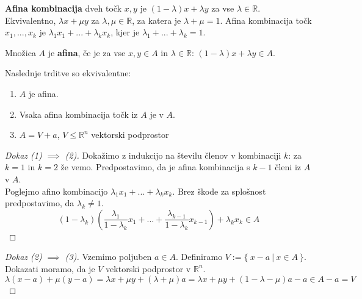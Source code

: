 \documentclass[11pt, a4paper]{article}
\begin{document}
    \begin{definition}
        \textbf{Afina kombinacija} dveh točk \(x,y\) je \((1-\lambda) x + \lambda y\) za vse \(\lambda \in \mathbb{R}\). \\
        Ekvivalentno, \(\lambda x + \mu y\) za \(\lambda, \mu \in \mathbb{R}\), za katera je \(\lambda + \mu = 1\).
        Afina kombinacija točk \(x_1,...,x_k\) je \(\lambda_1 x_1 + ... + \lambda_k x_k\), kjer je \(\lambda_1 + ... + \lambda_k = 1\).
    \end{definition}

    \begin{definition}
        Množica \(A\) je \textbf{afina}, če je za vse \(x,y \in A\) in \(\lambda \in \mathbb{R}\): \((1-\lambda) x + \lambda y \in A\).
    \end{definition}

    \begin{proposition}
        Naslednje trditve so ekvivalentne:
        \begin{enumerate}[label=(\arabic*)]
            \item \(A\) je afina.
            \item Vsaka afina kombinacija točk iz \(A\) je v \(A\).
            \item \(A = V + a\), \(V \le \mathbb{R}^n\) vektorski podprostor
        \end{enumerate}
    \end{proposition}

    \begin{proof}[Dokaz \emph{(1)} \(\implies\) \emph{(2)}]
        Dokažimo z indukcijo na številu členov v kombinaciji \(k\): za \(k=1\) in \(k=2\) že vemo. Predpostavimo, da je afina kombinacija s \(k-1\) členi iz \(A\) v \(A\). \\
        Poglejmo afino kombinacijo \(\lambda_1 x_1 + ... + \lambda_k x_k\). Brez škode za splošnost predpostavimo, da \(\lambda_k \neq 1\). 
        \[
            (1-\lambda_k) (\frac{\lambda_1}{1-\lambda_k} x_1 + ... + \frac{\lambda_{k-1}}{1-\lambda_k} x_{k-1}) + \lambda_k x_k \in A    
        \]

    \end{proof}

    \begin{proof}[Dokaz \emph{(2)} \(\implies\) \emph{(3)}]
        Vzemimo poljuben \(a \in A\). Definiramo \(V := \{\ x-a\ |\ x \in A\ \}\). Dokazati moramo, da je \(V\) vektorski podprostor v \(\mathbb{R}^n\). \\
        \[
            \lambda (x-a) + \mu (y-a) = \lambda x + \mu y + (\lambda + \mu) a = \lambda x + \mu y + (1 - \lambda - \mu) a - a \in A - a = V     
        \]
    \end{proof}
\end{document}
